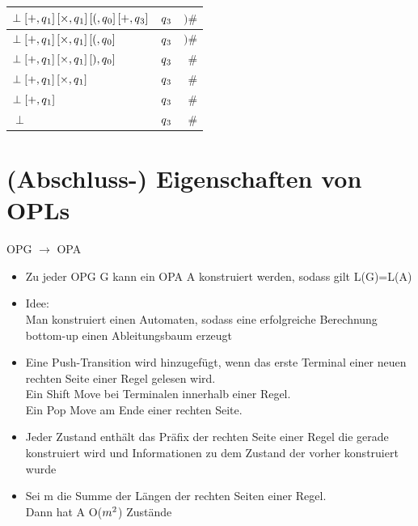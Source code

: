 \documentclass[
10pt,
pantone315, 	%
]{beamer}
\begin{document}
\begin{frame}
\begin{tabular}{| l | c | r |}
	$\perp\left[+, q\textsubscript{1} \right]\left[\times, q\textsubscript{1} \right] \left[(, q\textsubscript{0} \right] \left[+, q\textsubscript{3} \right]$ 
	& $q \textsubscript{3}$ & $)\#$ \\ \hline
	
	$\perp\left[+, q\textsubscript{1} \right]\left[\times, q\textsubscript{1} \right] \left[(, q\textsubscript{0} \right]$ 
	& $q \textsubscript{3}$ & $)\#$ \\ \hline
	
	$\perp\left[+, q\textsubscript{1} \right]\left[\times, q\textsubscript{1} \right] \left[), q\textsubscript{0} \right]$ 
	& $q \textsubscript{3}$ & $\#$ \\ \hline
	
	$\perp\left[+, q\textsubscript{1} \right]\left[\times, q\textsubscript{1} \right]$ 
	& $q \textsubscript{3}$ & $\#$ \\ \hline
	
	$\perp\left[+, q\textsubscript{1} \right]$ 
	& $q \textsubscript{3}$ & $\#$ \\ \hline
	
	$\perp$ 
	& $q \textsubscript{3}$ & $\#$ \\ \hline
	\end{tabular}
	
\end{frame}


\section{(Abschluss-) Eigenschaften von OPLs}
\begin{frame}[t]{OPG $\rightarrow$ OPA}
	\begin{itemize}[<+->]
	\item
	Zu jeder OPG G kann ein OPA A konstruiert werden, sodass gilt L(G)=L(A)
	\item
	Idee: \\
	Man konstruiert einen Automaten, sodass eine erfolgreiche Berechnung \glqq bottom-up \grqq einen Ableitungsbaum erzeugt
	\item
	 Eine Push-Transition wird hinzugefügt, wenn das erste Terminal einer neuen rechten Seite einer Regel gelesen wird. \\
	Ein Shift Move bei Terminalen innerhalb einer Regel.\\
	Ein Pop Move am Ende einer rechten Seite.
	\item
	Jeder Zustand enthält das Präfix der rechten Seite einer Regel die gerade konstruiert wird und Informationen zu dem Zustand der vorher konstruiert wurde
	\item
	Sei m die Summe der Längen der rechten Seiten einer Regel. \\
	Dann hat A O($m \textsuperscript{2}$) Zustände
	
	\end{itemize}
\end{frame}
\end{document}
